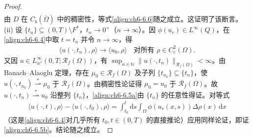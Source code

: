\documentclass[../../main.tex]{subfiles}%
\begin{document}
\begin{proof}
\begin{align*}
\end{align*}
由 $D$ 在 $C_b(\overline\Omega)$ 中的稠密性，等式\eqref{align:ch6-6.6}随之成立。这证明了该断言。
(ii) 设 $\{t_n\}\subseteq(0,T)\setminus F^*$，$t_n\to0^+$（$n\to\infty$）。因 $\phi(u_r)\in L^\infty(Q)$，在\eqref{align:ch6-6.4}中取 $t=t_n$ 并令 $n\to\infty$，得
\begin{align*}
\langle u(\cdot,t_n),\rho\rangle\to\langle u_0,\rho\rangle
\quad\text{对所有 }\rho\in C^2_c(\Omega).
\end{align*}
又因 $u\in L^\infty_{w^*}(0,T;\mathscr{R}_f(\Omega))$，有 $\sup_{n\in\mathbb{N}}\|u(\cdot,t_n)\|_{\mathscr{R}_f(\Omega)}<\infty$。由 Banach--Alaoglu 定理，存在 $\mu_0\in\mathscr{R}_f(\Omega)$ 及子列 $\{t_{n_k}\}\subseteq\{t_n\}$，使 $u(\cdot,t_{n_k})\stackrel{*}{\rightharpoonup}\mu_0$ 于 $\mathscr{R}_f(\Omega)$。由稠密性论证得 $\mu_0=u_0$ 于 $\mathscr{R}_f(\Omega)$。故 $u(\cdot,t_n)\stackrel{*}{\rightharpoonup}u_0$ 沿整列 $\{t_n\}$，\eqref{align:ch6-6.5a}由 $\{t_n\}$ 的任意性得证。对等式
\begin{align*}
\langle u(\cdot,t),\rho\rangle-\langle u(\cdot,t_0),\rho\rangle
= \int_{t_0}^t\mathrm{d}s\int_\Omega\phi(u_r(x,s))\Delta\rho(x)\,\mathrm{d}x
\end{align*}
（这是\eqref{align:ch6-6.4}对几乎所有 $t_0,t\in(0,T)$ 的直接推论）应用同样论证，即证\eqref{align:ch6-6.5b}。结论随之成立。
\end{proof}
\end{document}
